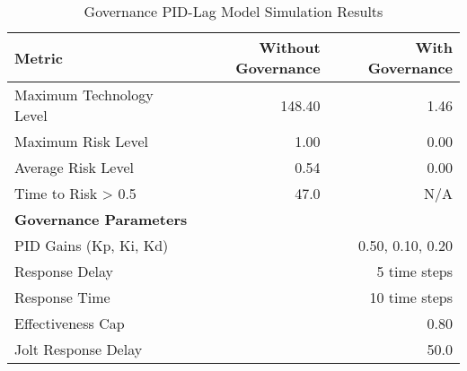
\begin{table}[ht]
\centering
\caption{Governance PID-Lag Model Simulation Results}
\label{tab:pid_lag_results}
\begin{tabular}{lrr}
\toprule
\textbf{Metric} & \textbf{Without Governance} & \textbf{With Governance} \\
\midrule
Maximum Technology Level & 148.40 & 1.46 \\
Maximum Risk Level & 1.00 & 0.00 \\
Average Risk Level & 0.54 & 0.00 \\
Time to Risk > 0.5 & 47.0 & N/A \\
\midrule
\multicolumn{3}{l}{\textbf{Governance Parameters}} \\
PID Gains (Kp, Ki, Kd) & \multicolumn{2}{r}{0.50, 0.10, 0.20} \\
Response Delay & \multicolumn{2}{r}{5 time steps} \\
Response Time & \multicolumn{2}{r}{10 time steps} \\
Effectiveness Cap & \multicolumn{2}{r}{0.80} \\
Jolt Response Delay & \multicolumn{2}{r}{50.0} \\
\bottomrule
\end{tabular}
\end{table}
